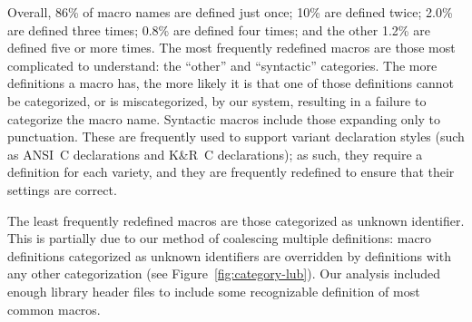 \documentclass[10pt]{article}
\newcommand{\captionsmall}[1]{\caption[]{\small #1}}
\begin{document}


Overall, 86\% of macro names are defined just once; 10\% are defined twice;
2.0\% are defined three times; 0.8\% are defined four times; and the other
1.2\% are defined five or more times.
The most frequently redefined macros are those most complicated to
understand: the ``other'' and ``syntactic'' categories.  The more
definitions a macro has, the more likely it is that one of those
definitions cannot be categorized, or is miscategorized, by our system,
resulting in a failure to categorize the macro name.  Syntactic macros
include those expanding only to punctuation.  These are frequently used to
support variant declaration styles (such as ANSI~C declarations and K\&R~C
declarations); as such, they require a definition for each variety, and
they are frequently redefined to ensure that their
settings are correct.


The least frequently redefined macros are those categorized as unknown
identifier.  This is partially due to our method of coalescing multiple
definitions:  macro definitions categorized as unknown identifiers are overridden
by definitions with any other categorization (see
Figure~\ref{fig:category-lub}).  Our
analysis included enough library header files to include some
recognizable definition of most common macros.
\end{document}
